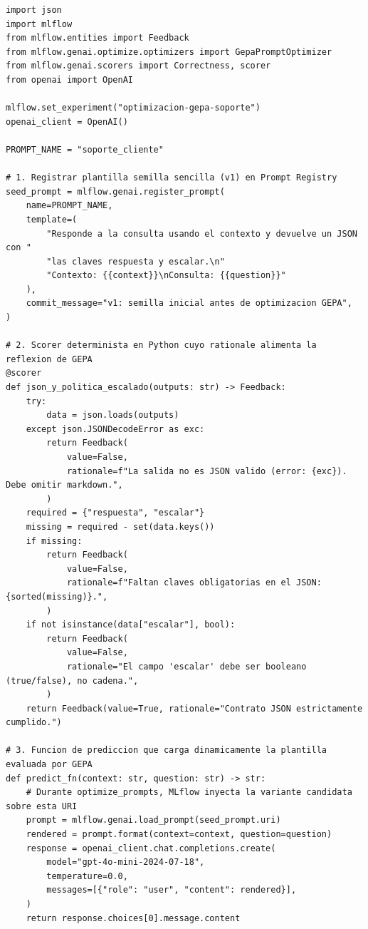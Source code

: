 \begin{lstlisting}[style=python, caption={Optimización automática de un prompt registrado mediante GEPA en MLflow 3 (\code{mlflow.genai.optimize\_prompts}).}, label={lst:gepa-mlflow}]
import json
import mlflow
from mlflow.entities import Feedback
from mlflow.genai.optimize.optimizers import GepaPromptOptimizer
from mlflow.genai.scorers import Correctness, scorer
from openai import OpenAI

mlflow.set_experiment("optimizacion-gepa-soporte")
openai_client = OpenAI()

PROMPT_NAME = "soporte_cliente"

# 1. Registrar plantilla semilla sencilla (v1) en Prompt Registry
seed_prompt = mlflow.genai.register_prompt(
    name=PROMPT_NAME,
    template=(
        "Responde a la consulta usando el contexto y devuelve un JSON con "
        "las claves respuesta y escalar.\n"
        "Contexto: {{context}}\nConsulta: {{question}}"
    ),
    commit_message="v1: semilla inicial antes de optimizacion GEPA",
)

# 2. Scorer determinista en Python cuyo rationale alimenta la reflexion de GEPA
@scorer
def json_y_politica_escalado(outputs: str) -> Feedback:
    try:
        data = json.loads(outputs)
    except json.JSONDecodeError as exc:
        return Feedback(
            value=False,
            rationale=f"La salida no es JSON valido (error: {exc}). Debe omitir markdown.",
        )
    required = {"respuesta", "escalar"}
    missing = required - set(data.keys())
    if missing:
        return Feedback(
            value=False,
            rationale=f"Faltan claves obligatorias en el JSON: {sorted(missing)}.",
        )
    if not isinstance(data["escalar"], bool):
        return Feedback(
            value=False,
            rationale="El campo 'escalar' debe ser booleano (true/false), no cadena.",
        )
    return Feedback(value=True, rationale="Contrato JSON estrictamente cumplido.")

# 3. Funcion de prediccion que carga dinamicamente la plantilla evaluada por GEPA
def predict_fn(context: str, question: str) -> str:
    # Durante optimize_prompts, MLflow inyecta la variante candidata sobre esta URI
    prompt = mlflow.genai.load_prompt(seed_prompt.uri)
    rendered = prompt.format(context=context, question=question)
    response = openai_client.chat.completions.create(
        model="gpt-4o-mini-2024-07-18",
        temperature=0.0,
        messages=[{"role": "user", "content": rendered}],
    )
    return response.choices[0].message.content


\end{lstlisting}
